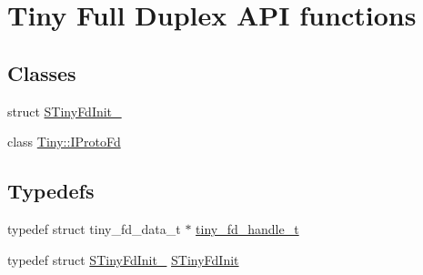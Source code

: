\hypertarget{group__FULL__DUPLEX__API}{}\section{Tiny Full Duplex A\+PI functions}
\label{group__FULL__DUPLEX__API}
\subsection*{Classes}
\begin{DoxyCompactItemize}
\item 
struct \hyperlink{structSTinyFdInit__}{S\+Tiny\+Fd\+Init\+\_\+}
\item 
class \hyperlink{classTiny_1_1IProtoFd}{Tiny\+::\+I\+Proto\+Fd}
\end{DoxyCompactItemize}
\subsection*{Typedefs}
\begin{DoxyCompactItemize}
\item 
typedef struct tiny\+\_\+fd\+\_\+data\+\_\+t $\ast$ \hyperlink{group__FULL__DUPLEX__API_ga91e6b79431fe38570fb102701ef0b7e8}{tiny\+\_\+fd\+\_\+handle\+\_\+t}
\item 
typedef struct \hyperlink{structSTinyFdInit__}{S\+Tiny\+Fd\+Init\+\_\+} \hyperlink{group__FULL__DUPLEX__API_gac931714d7bbe299856f4533fd1edb7f6}{S\+Tiny\+Fd\+Init}
\end{DoxyCompactItemize}
